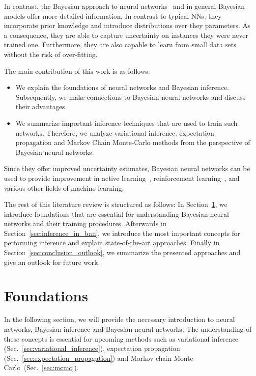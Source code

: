 \documentclass[runningheads]{llncs}
\begin{document}
In contrast, the Bayesian approach to neural networks~\cite{mackay1992practical,Neal:1995:BLN:922680} and in general Bayesian models offer more detailed information.
In contrast to typical NNs, they incorporate prior knowledge and introduce distributions over they parameters.
As a consequence, they are able to capture uncertainty on instances they were never trained one.
Furthermore, they are also capable to learn from small data sets without the risk of over-fitting.

The main contribution of this work is as follows:
\begin{itemize}
    \item We explain the foundations of neural networks and Bayesian inference.
    Subsequently, we make connections to Bayesian neural networks and discuss their advantages.
    \item We summarize important inference techniques that are used to train such networks. 
    Therefore, we analyze variational inference, expectation propagation and Markov Chain Monte-Carlo methods from the perspective of Bayesian neural networks.
\end{itemize}
Since they offer improved uncertainty estimates, Bayesian neural networks can be used to provide improvement in active learning~\cite{Gal2016Active,hernandez2015probabilistic}, reinforcement learning~\cite{BlundellBBB,Gal2016Dropout}, and various other fields of machine learning.

The rest of this literature review is structured as follows: 
In Section~\ref{sec:foundation}, we introduce foundations that are essential for understanding Bayesian neural networks and their training procedures.
Afterwards in Section~\ref{sec:inference_in_bnn}, we introduce the most important concepts for performing inference and explain state-of-the-art approaches.
Finally in Section~\ref{sec:conclusion_outlook}, we summarize the presented approaches and give an outlook for future work.

\section{Foundations}
\label{sec:foundation}
In the following section, we will provide the necessary introduction to neural networks, Bayesian inference and Bayesian neural networks.
The understanding of these concepts is essential for upcoming methods such as variational inference (Sec.~\ref{sec:variational_inference}), expectation propagation (Sec.~\ref{sec:expectation_propagation}) and Markov chain Monte-Carlo~(Sec.~\ref{sec:mcmc}).
\end{document}
